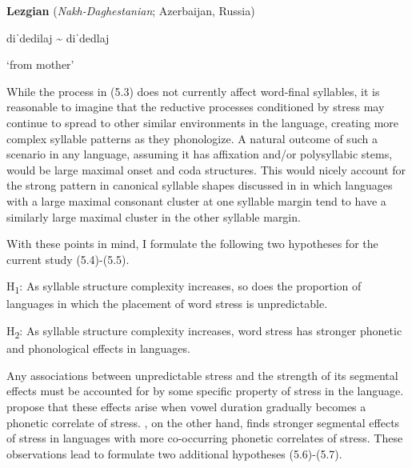 \ea\label{ex:(5.3)}
  \textbf{Lezgian} (\textit{Nakh-Daghestanian}; Azerbaijan, Russia)



diˈdedilaj {\textasciitilde} diˈdedlaj



‘from mother’



\citep[40]{Haspelmath1993}

\z


  While the process in (5.3) does not currently affect word-final syllables, it is reasonable to imagine that the reductive processes conditioned by stress may continue to spread to other similar environments in the language, creating more complex syllable patterns as they phonologize. A natural outcome of such a scenario in any language, assuming it has affixation and/or polysyllabic stems, would be large maximal onset and coda structures. This would nicely account for the strong pattern in canonical syllable shapes discussed in  in which languages with a large maximal consonant cluster at one syllable margin tend to have a similarly large maximal cluster in the other syllable margin.



  With these points in mind, I formulate the following two hypotheses for the current study (5.4)-(5.5).



\ea\label{ex:(5.4)}
  H\textsubscript{1}: As syllable structure complexity increases, so does the proportion of languages in which the placement of word stress is unpredictable.



\ea\label{ex:(5.5)}
\z
  H\textsubscript{2}: As syllable structure complexity increases, word stress has stronger phonetic and phonological effects in languages.


\z

  Any associations between unpredictable stress and the strength of its segmental effects must be accounted for by some specific property of stress in the language. \citet{BybeeEtAl1998} propose that these effects arise when vowel duration gradually becomes a phonetic correlate of stress. \citet{Schiering2007}, on the other hand, finds stronger segmental effects of stress in languages with more co-occurring phonetic correlates of stress. These observations lead to formulate two additional hypotheses (5.6)-(5.7).



